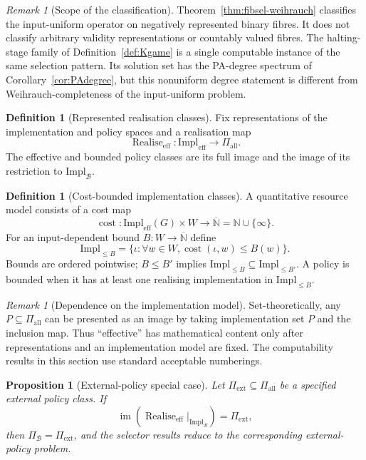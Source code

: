 \documentclass[11pt]{article}
\theoremstyle{plain}
\newtheorem{proposition}[theorem]{Proposition}
\theoremstyle{definition}
\newtheorem{definition}[theorem]{Definition}
\theoremstyle{remark}
\newtheorem{remark}[theorem]{Remark}
\newcommand{\N}{\mathbb{N}}
\newcommand{\im}{\operatorname{im}}
\newcommand{\realise}{\operatorname{Realise}}
\begin{document}
\begin{remark}[Scope of the classification]
Theorem~\ref{thm:fibsel-weihrauch} classifies the input-uniform operator on
negatively represented binary fibres. It does not classify arbitrary validity
representations or countably valued fibres. The halting-stage family of
Definition~\ref{def:Kgame} is a single computable instance of the same selection
pattern. Its solution set has the PA-degree spectrum of
Corollary~\ref{cor:PAdegree}, but this nonuniform degree statement is different
from Weihrauch-completeness of the input-uniform problem.
\end{remark}

\begin{definition}[Represented realisation classes]\label{def:represented-realisation}
Fix representations of the implementation and policy spaces and a realisation
map
\[
\realise_{\mathrm{eff}}:\mathrm{Impl}_{\mathrm{eff}}
\to\Pi_{\mathrm{all}}.
\]
The effective and bounded policy classes are its full image and the image of its
restriction to $\mathrm{Impl}_{\mathcal B}$.
\end{definition}

\begin{definition}[Cost-bounded implementation classes]\label{def:cost}
A quantitative resource model consists of a cost map
\[
\operatorname{cost}:\mathrm{Impl}_{\mathrm{eff}}(G)\times W
\to\overline{\N}=\N\cup\{\infty\}.
\]
For an input-dependent bound $B:W\to\overline{\N}$ define
\[
\mathrm{Impl}_{\le B}
=\{\iota:\forall w\in W,
\operatorname{cost}(\iota,w)\le B(w)\}.
\]
Bounds are ordered pointwise; $B\le B'$ implies
$\mathrm{Impl}_{\le B}\subseteq\mathrm{Impl}_{\le B'}$. A policy is bounded
when it has at least one realising implementation in $\mathrm{Impl}_{\le B}$.
\end{definition}

\begin{remark}[Dependence on the implementation model]\label{rem:abstractimage}
Set-theoretically, any $P\subseteq\Pi_{\mathrm{all}}$ can be presented as an
image by taking implementation set $P$ and the inclusion map. Thus ``effective''
has mathematical content only after representations and an implementation model
are fixed. The computability results in this section use standard acceptable numberings.
\end{remark}

\begin{proposition}[External-policy special case]\label{prop:nonembedded}
Let $\Pi_{\mathrm{ext}}\subseteq\Pi_{\mathrm{all}}$ be a specified external
policy class. If
\[
\im\!\left(
\realise_{\mathrm{eff}}|_{\mathrm{Impl}_{\mathcal B}}
\right)=\Pi_{\mathrm{ext}},
\]
then $\Pi_{\mathcal B}=\Pi_{\mathrm{ext}}$, and the selector results reduce to
the corresponding external-policy problem.
\end{proposition}
\end{document}
